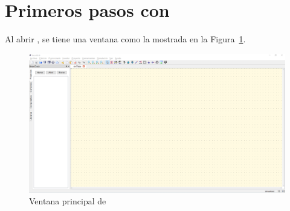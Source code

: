 \documentclass[a4paper,10pt]{article} %
\begin{document}
\section{Primeros pasos con \qucs}

Al abrir \qucs, se tiene una ventana como la mostrada en la Figura~\ref{fig.qucs1}. 
\begin{figure}[htbp]
    \centering
    \includegraphics[width=\linewidth]{../figs/qucs1.PNG}
    \caption{Ventana principal de \qucs}
    \label{fig.qucs1}
\end{figure}
\end{document}
